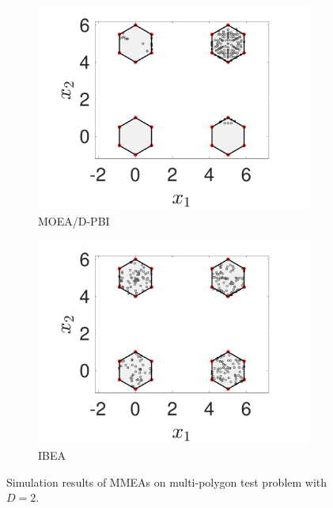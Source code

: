 \documentclass[conference]{IEEEtran}
\begin{document}
\begin{figure}[htbp]
    \begin{subfigure}[b]{.24\textwidth}
    \includegraphics[width=\linewidth]{Section5/dim2/PS/MOEAD_PBI}
    \caption{MOEA/D-PBI}
    \end{subfigure}
    \begin{subfigure}[b]{.24\textwidth}
    \includegraphics[width=\linewidth]{Section5/dim2/PS/IBEA}
    \caption{IBEA}
    \end{subfigure}

    \caption{Simulation results of MMEAs on multi-polygon test problem with $D=2$.}
    \label{fig: MOEAs PS dim=2}
\end{figure}
\end{document}
